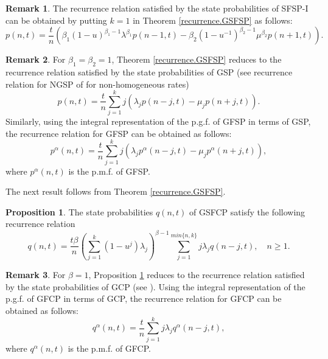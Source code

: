 \documentclass[11pt,oneside,reqno]{amsart}
\theoremstyle{definition}
\newtheorem{remark}{\bf Remark}[section]
\newtheorem{proposition}{Proposition}[section]
\theoremstyle{remarkstyle}
\begin{document}
\begin{remark}
    The recurrence relation satisfied by the state probabilities of SFSP-I can be obtained by putting $k=1$ in Theorem \ref{recurrence.GSFSP} as follows:
    \begin{equation*}
     p(n,t)=\frac{t}{n}(\beta_1(1-u)^{\beta_1-1}\lambda^{\beta_1} p(n-1,t)-\beta_2(1-u^{-1})^{\beta_2-1}\mu^{\beta_2} p(n+1,t)).
    \end{equation*}
\end{remark}

\begin{remark}
    For $\beta_1=\beta_2=1$, Theorem \ref{recurrence.GSFSP} reduces to the recurrence relation satisfied by the state probabilities of GSP (see recurrence relation for NGSP of \citet{Tathe2024} for non-homogeneous rates)
    \begin{equation*}
        p(n,t)=\frac{t}{n}\sum_{j=1}^{k}j(\lambda_jp(n-j,t)-\mu_jp(n+j,t)).
    \end{equation*}
    Similarly, using the  integral representation of the p.g.f. of GFSP in terms of GSP, the recurrence relation for GFSP can be obtained as follows:
    \begin{equation*}
        p^\alpha(n,t)=\frac{t}{n}\sum_{j=1}^{k}j(\lambda_jp^\alpha(n-j,t)-\mu_jp^\alpha(n+j,t)),
    \end{equation*}
    where $p^\alpha(n,t)$ is the p.m.f. of GFSP.
\end{remark}
The next result follows from Theorem \ref{recurrence.GSFSP}.
\begin{proposition}\label{recurrence.GSFCP}
    The state probabilities $q(n,t)$ of GSFCP satisfy the following recurrence relation
\begin{equation*}
    q(n,t)=\frac{t\beta}{n}(\sum_{j=1}^{k}(1-u^j)\lambda_j)^{\beta-1}\sum_{j=1}^{min\{n,k\}}j\lambda_jq(n-j,t),\quad n\geq 1.
\end{equation*}
\end{proposition}
\begin{remark}
    For $\beta=1$, Proposition \ref{recurrence.GSFCP} reduces to the recurrence relation satisfied by the state probabilities of GCP (see \citet{KatariaGFCP}). Using the  integral representation of the p.g.f. of GFCP in terms of GCP, the recurrence relation for GFCP can be obtained as follows:
    \begin{equation*}
        q^\alpha(n,t)=\frac{t}{n}\sum_{j=1}^{k}j\lambda_jq^\alpha(n-j,t),
    \end{equation*}
     where $q^\alpha(n,t)$ is the p.m.f. of GFCP.
\end{remark}
\end{document}
